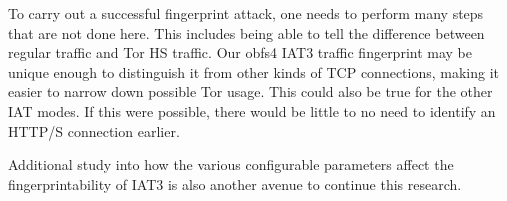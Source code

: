 \documentclass[11pt]{article}
\begin{document}
To carry out a successful fingerprint attack, one needs to perform many steps that are not done here. This includes being able to tell the difference between regular traffic and Tor HS traffic. Our obfs4 IAT3 traffic fingerprint may be unique enough to distinguish it from other kinds of TCP connections, making it easier to narrow down possible Tor usage. This could also be true for the other IAT modes. If this were possible, there would be little to no need to identify an HTTP/S connection earlier.

Additional study into how the various configurable parameters affect the fingerprintability of IAT3 is also another avenue to continue this research.

\printbibliography
\end{document}
